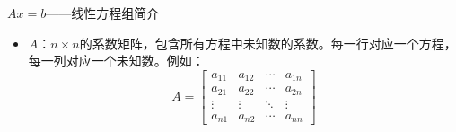 \documentclass[UTF8,aspectratio=169]{beamer}
\begin{document}
\begin{frame}{$Ax=b$——线性方程组简介}
        \begin{itemize}
            \item $A$：$n\times n$的系数矩阵，包含所有方程中未知数的系数。每一行对应一个方程，每一列对应一个未知数。例如：
            \[
                A = \begin{bmatrix}
                    a_{11} & a_{12} & \cdots & a_{1n} \\
                    a_{21} & a_{22} & \cdots & a_{2n} \\
                    \vdots & \vdots & \ddots & \vdots \\
                    a_{n1} & a_{n2} & \cdots & a_{nn}
                \end{bmatrix}
            \]
            \begin{columns}
            \end{columns}
        \end{itemize}
\end{frame}
\end{document}
